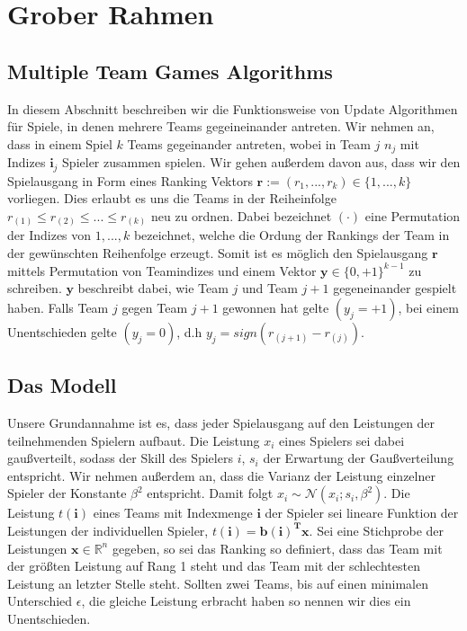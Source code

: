 \documentclass[12pt,a4paper]{scrartcl}
\numberwithin{equation}{section}
\newcommand{\R}{\mathbb{R}} %
\begin{document}
{   \section{Grober Rahmen}
   
   \subsection{Multiple Team Games Algorithms}
   
   In diesem Abschnitt beschreiben wir die Funktionsweise von Update Algorithmen für Spiele, in denen mehrere 
   Teams gegeineinander antreten. 
   Wir nehmen an, dass in einem Spiel $k$ Teams gegeinander antreten, wobei in Team $j$ $n_j$ mit Indizes $\mathbf{i}_j$ Spieler zusammen
   spielen. Wir gehen außerdem davon aus, dass wir den Spielausgang in Form eines Ranking Vektors
   $\mathbf{r} := (r_1,...,r_k) \in \{1,...,k\}$ vorliegen. Dies erlaubt es uns die Teams in der Reiheinfolge
   $ r_{(1)} \leq r_{(2)} \leq ... \leq r_{(k)}$ neu zu ordnen. Dabei bezeichnet $( \cdot )$ eine Permutation 
   der Indizes von $1,...,k$ bezeichnet, welche die Ordung der Rankings der Team in der gewünschten Reihenfolge
   erzeugt. Somit ist es möglich den Spielausgang $\mathbf{r}$ mittels Permutation von Teamindizes und einem Vektor 
   $\mathbf{y} \in \{0, +1\}^{k-1}$ zu schreiben. $\mathbf{y}$ beschreibt dabei, wie Team $j$ und Team $j+1$ gegeneinander
   gespielt haben. Falls  Team $j$ gegen Team $j+1$ gewonnen hat gelte $(y_j = +1)$, bei einem Unentschieden gelte 
   $(y_j = 0)$, d.h $y_j = sign(r_{(j+1)} - r_{(j)})$.
   
   \subsection{Das Modell}
   
   Unsere Grundannahme ist es, dass jeder Spielausgang auf den Leistungen der teilnehmenden Spielern aufbaut. Die 
   Leistung $x_i$ eines Spielers sei dabei gaußverteilt, sodass der Skill des Spielers $i$, $s_i$ der Erwartung der Gaußverteilung entspricht. 
   Wir nehmen außerdem an, dass die Varianz der Leistung einzelner Spieler der Konstante $\beta^2$ entspricht. Damit folgt $x_i \sim \mathcal{N}(x_i; s_i, \beta^2)$.
   Die Leistung $t(\mathbf{i})$ eines Teams mit Indexmenge $\mathbf{i}$ der Spieler sei lineare Funktion der Leistungen der individuellen Spieler, $t(\mathbf{i}) = \mathbf{b(i)^T x}$.
   Sei eine Stichprobe der Leistungen $\mathbf{x} \in \R^n$ gegeben, so sei das Ranking so definiert, dass das Team mit der größten Leistung auf Rang 1 steht und das Team mit der
   schlechtesten Leistung an letzter Stelle steht. Sollten zwei Teams, bis auf einen minimalen Unterschied $\epsilon$, die gleiche Leistung erbracht haben so nennen wir dies ein Unentschieden.
   

}
\end{document}
